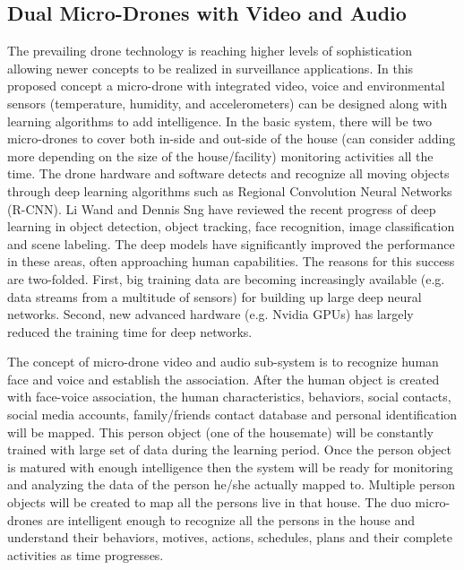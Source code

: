 \documentclass[sigconf]{acmart}
\begin{document}
\subsection{Dual Micro-Drones with Video and Audio}
The prevailing drone technology is reaching higher levels of sophistication allowing newer concepts to be realized in surveillance applications\cite{Labs2016}. In this proposed concept a micro-drone with integrated video, voice and environmental sensors (temperature, humidity, and accelerometers) can be designed along with learning algorithms to add intelligence. In the basic system, there will be two micro-drones to cover both in-side and out-side of the house (can consider adding more depending on the size of the house/facility) monitoring activities all the time. The drone hardware and software detects and recognize all moving objects through deep learning algorithms such as Regional Convolution Neural Networks (R-CNN). Li Wand and Dennis Sng\cite{Wang2015} have reviewed the recent progress of deep learning in object detection, object tracking, face recognition, image classification and scene labeling. The deep models have significantly improved the performance in these areas, often approaching human capabilities. The reasons for this success are two-folded. First, big training data are becoming increasingly available (e.g. data streams from a multitude of sensors) for building up large deep neural networks. Second, new advanced hardware (e.g. Nvidia GPUs) has largely reduced the training time for deep networks. 

The concept of micro-drone video and audio sub-system is to recognize human face and voice and establish the association. After the human object is created with face-voice association, the human characteristics, behaviors, social contacts, social media accounts, family/friends contact database and personal identification will be mapped. This person object (one of the housemate) will be constantly trained with large set of data during the learning period. Once the person object is matured with enough intelligence then the system will be ready for monitoring and analyzing the data of the person he/she actually mapped to. Multiple person objects will be created to map all the persons live in that house. The duo micro-drones are intelligent enough to recognize all the persons in the house and understand their behaviors, motives, actions, schedules, plans and their complete activities as time progresses.  
\end{document}
